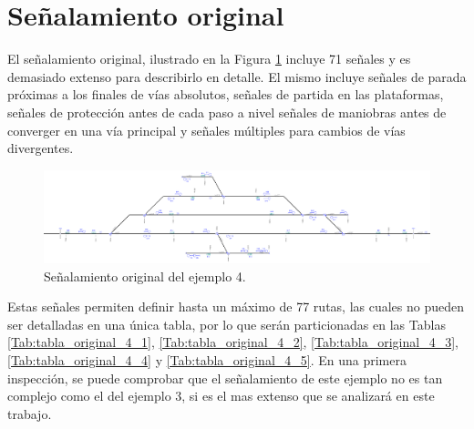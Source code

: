 \section{Señalamiento original}

    El señalamiento original, ilustrado en la Figura \ref{fig:EJ4_2} incluye 71 señales y es demasiado extenso para describirlo en detalle. El mismo incluye señales de parada próximas a los finales de vías absolutos, señales de partida en las plataformas, señales de protección antes de cada paso a nivel  señales de maniobras antes de converger en una vía principal y señales múltiples para cambios de vías divergentes.
    
    \begin{figure}[H]
    	\centering
    	\includegraphics[width=1\textwidth]{resultados-obtenidos/ejemplo4/images/4_original.png}
    	\centering\caption{Señalamiento original del ejemplo 4.}
    	\label{fig:EJ4_2}
    \end{figure}
    
    Estas señales permiten definir hasta un máximo de 77 rutas, las cuales no pueden ser detalladas en una única tabla, por lo que serán particionadas en las Tablas \ref{Tab:tabla_original_4_1}, \ref{Tab:tabla_original_4_2}, \ref{Tab:tabla_original_4_3}, \ref{Tab:tabla_original_4_4} y \ref{Tab:tabla_original_4_5}. En una primera inspección, se puede comprobar que el señalamiento de este ejemplo no es tan complejo como el del ejemplo 3, si es el mas extenso que se analizará en este trabajo.    
    
